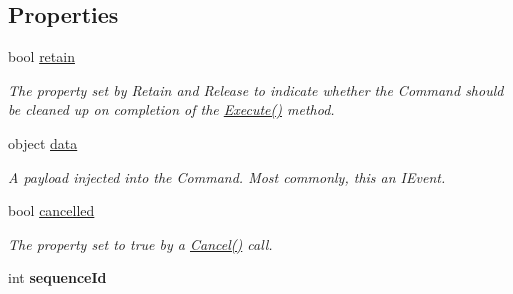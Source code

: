 \subsection*{Properties}
\begin{DoxyCompactItemize}
\item 
\hypertarget{interfacestrange_1_1extensions_1_1command_1_1api_1_1_i_command_ac69e1fd7542d521e9e04c24bc47791bb}{bool \hyperlink{interfacestrange_1_1extensions_1_1command_1_1api_1_1_i_command_ac69e1fd7542d521e9e04c24bc47791bb}{retain}}\label{interfacestrange_1_1extensions_1_1command_1_1api_1_1_i_command_ac69e1fd7542d521e9e04c24bc47791bb}

\begin{DoxyCompactList}\small\item\em The property set by {\ttfamily Retain} and {\ttfamily Release} to indicate whether the Command should be cleaned up on completion of the {\ttfamily \hyperlink{interfacestrange_1_1extensions_1_1command_1_1api_1_1_i_command_a49ddf3bbaf19624534fa99fa4725feca}{Execute()}} method. \end{DoxyCompactList}\item 
\hypertarget{interfacestrange_1_1extensions_1_1command_1_1api_1_1_i_command_afa2693fc9c9747093acde1dcab858570}{object \hyperlink{interfacestrange_1_1extensions_1_1command_1_1api_1_1_i_command_afa2693fc9c9747093acde1dcab858570}{data}}\label{interfacestrange_1_1extensions_1_1command_1_1api_1_1_i_command_afa2693fc9c9747093acde1dcab858570}

\begin{DoxyCompactList}\small\item\em A payload injected into the Command. Most commonly, this an I\-Event. \end{DoxyCompactList}\item 
bool \hyperlink{interfacestrange_1_1extensions_1_1command_1_1api_1_1_i_command_a213e1477e49f74dbbaa9a85887af4b5b}{cancelled}
\begin{DoxyCompactList}\small\item\em The property set to true by a \hyperlink{interfacestrange_1_1extensions_1_1command_1_1api_1_1_i_command_afe6c708912de7fe65dbe44d1ba83b547}{Cancel()} call. \end{DoxyCompactList}\item 
\hypertarget{interfacestrange_1_1extensions_1_1command_1_1api_1_1_i_command_aaf31811d9547a0c45cc143f5ca828dbe}{int {\bfseries sequence\-Id}}\label{interfacestrange_1_1extensions_1_1command_1_1api_1_1_i_command_aaf31811d9547a0c45cc143f5ca828dbe}

\end{DoxyCompactItemize}


